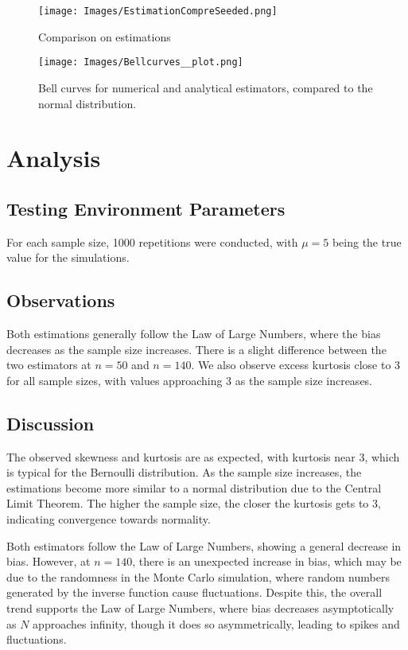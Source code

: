 \documentclass{report}
\begin{document}
\begin{figure}[H]
  \centering
  \texttt{[image: Images/EstimationCompreSeeded.png]}
  \caption{Comparison on estimations}
  \label{fig:enter-label}
\end{figure}

\begin{figure}[H]
  \centering
  \texttt{[image: Images/Bellcurves\_\_plot.png]}
  \caption{Bell curves for numerical and analytical estimators, compared to the normal distribution.}
  \label{fig:enter-label}
\end{figure}



\section{Analysis}

\subsection{Testing Environment Parameters}
For each sample size, 1000 repetitions were conducted, with \(\mu = 5\) being the true value for the simulations.


\subsection{Observations}
Both estimations generally follow the Law of Large Numbers, where the bias decreases as the sample size increases.
There is a slight difference between the two estimators at \(n = 50\) and \(n = 140\).
We also observe excess kurtosis close to 3 for all sample sizes, with values approaching 3 as the sample size increases.


\subsection{Discussion}
The observed skewness and kurtosis are as expected, with kurtosis near 3, which is typical for the Bernoulli distribution.
As the sample size increases, the estimations become more similar to a normal distribution due to the Central Limit Theorem.
The higher the sample size, the closer the kurtosis gets to 3, indicating convergence towards normality.

Both estimators follow the Law of Large Numbers, showing a general decrease in bias.
However, at \(n = 140\), there is an unexpected increase in bias, which may be due to the randomness in the Monte Carlo simulation, where random numbers generated by the inverse function cause fluctuations.
Despite this, the overall trend supports the Law of Large Numbers, where bias decreases asymptotically as \(N\) approaches infinity, though it does so asymmetrically, leading to spikes and fluctuations.
\end{document}
